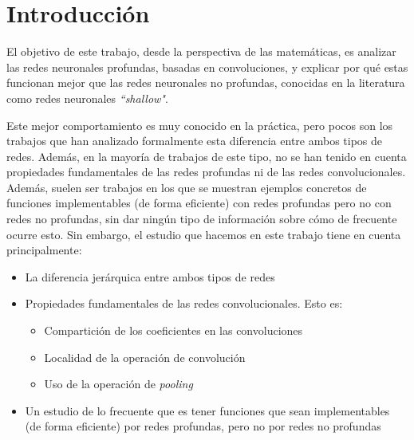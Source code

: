 
\chapter{Introducción}

El objetivo de este trabajo, desde la perspectiva de las matemáticas, es analizar las redes neuronales profundas, basadas en convoluciones, y explicar por qué estas funcionan mejor que las redes neuronales no profundas, conocidas en la literatura como redes neuronales \textit{``shallow"}.

Este mejor comportamiento es muy conocido en la práctica, pero pocos son los trabajos que han analizado formalmente esta diferencia entre ambos tipos de redes. Además, en la mayoría de trabajos de este tipo, no se han tenido en cuenta propiedades fundamentales de las redes profundas ni de las redes convolucionales. Además, suelen ser trabajos en los que se muestran ejemplos concretos de funciones implementables (de forma eficiente) con redes profundas pero no con redes no profundas, sin dar ningún tipo de información sobre cómo de frecuente ocurre esto. Sin embargo, el estudio que hacemos en este trabajo tiene en cuenta principalmente:

\begin{itemize}
    \item La diferencia jerárquica entre ambos tipos de redes
    \item Propiedades fundamentales de las redes convolucionales. Esto es:
        \begin{itemize}
            \item Compartición de los coeficientes en las convoluciones
            \item Localidad de la operación de convolución
            \item Uso de la operación de \textit{pooling}
        \end{itemize}
    \item Un estudio de lo frecuente que es tener funciones que sean implementables (de forma eficiente) por redes profundas, pero no por redes no profundas
\end{itemize}

